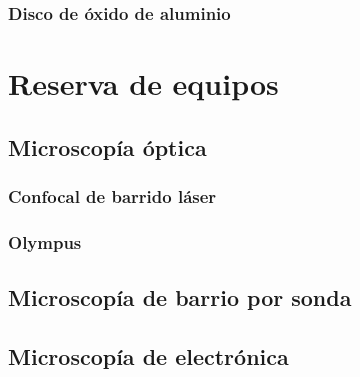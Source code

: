 \documentclass[11pt, letter-size]{article}
\begin{document}
	\subsubsection{Disco de \'oxido de aluminio}
	
	\section{Reserva de equipos}
	\subsection{Microscop\'ia \'optica}
	\subsubsection{Confocal de barrido l\'aser}
	\subsubsection{Olympus}
	\subsection{Microscop\'ia de barrio por sonda}
	\subsection{Microscop\'ia de electr\'onica}
	
\end{document}
